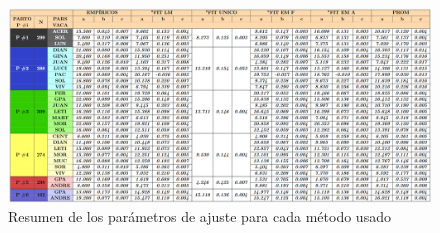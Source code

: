\begin{figure}[H]
    \centering
    \label{tab:allparams}
    \includegraphics[angle=90,scale=0.49]{img/TabParamsFitspng.png}
    \caption{Resumen de los parámetros de ajuste para cada método usado}
\end{figure}

